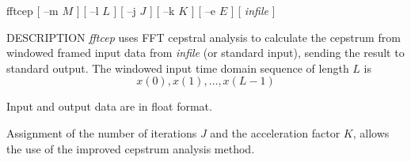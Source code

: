 % 
% 
% 
% 
%                                                                        
%
\hypertarget{fftcep}{}

\begin{synopsis}
\item[fftcep] [ --m $M$ ] [ --l $L$ ] [ --j $J$ ] [ --k $K$ ] 
	    [ --e $E$ ] [ {\em infile} ] 
\end{synopsis}

\begin{qsection}{DESCRIPTION}
{\em fftcep} uses FFT cepstral analysis to calculate the cepstrum 
from windowed framed input data from {\em infile} (or standard input), 
sending the result to standard output.
The windowed input time domain sequence of length $L$ is
\begin{displaymath}
  x(0),x(1),\dots,x(L-1)
\end{displaymath}
\par
Input and output data are in float format.
\par
Assignment of the number of iterations $J$ and
the acceleration factor $K$, allows the use of the improved cepstrum
analysis method.
\end{qsection}

